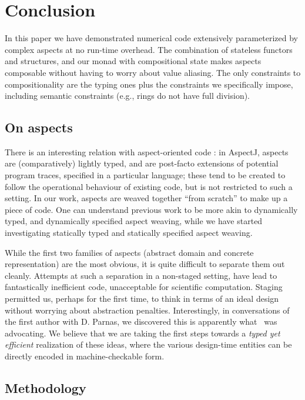 \documentclass{elsart}
\begin{document}
\section{Conclusion}\label{conclusion}
In this paper we have demonstrated numerical code extensively parameterized
by complex aspects at no run-time overhead.  The combination of
stateless functors and structures, and our monad with
compositional state makes aspects composable without having to
worry about value aliasing. The only constraints to compositionality
are the typing ones plus the constraints we specifically
impose, including semantic constraints (e.g., rings do not have full
division).

\subsection{On aspects}

There is an interesting relation with aspect-oriented code
\cite{kiczales97aspectoriented}: in AspectJ, 
aspects are (comparatively) lightly typed, and are post-facto extensions of
potential program traces, specified in a particular language; these tend
to be created to follow the operational behaviour of existing code, but
is not restricted to such a setting.
In our work, aspects are weaved together ``from scratch'' to
make up a piece of code.  One can understand previous work to be
more akin to dynamically typed, and dynamically specified aspect weaving, while
we have started investigating statically typed and statically specified
aspect weaving.

While the first two families of aspects (abstract domain and concrete
representation) are the most obvious, it is quite difficult to
separate them out cleanly. Attempts at such a separation in a
non-staged setting, have lead to fantastically inefficient code,
unacceptable for scientific computation. Staging permitted us, perhaps
for the first time, to think in terms of an ideal design without
worrying about abstraction penalties.  Interestingly, in conversations
of the first author with D. Parnas, we discovered this is
apparently what~\cite{journals/cacm/parnas72a} was advocating.  We
believe that we are taking the first steps towards a \emph{typed yet
  efficient} realization of these ideas, where the various design-time
entities can be directly encoded in machine-checkable form.

\subsection{Methodology}
\end{document}
